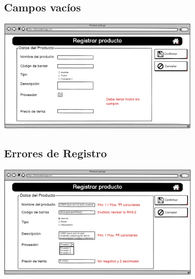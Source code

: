 \begin{flushleft}
	\subsection{Campos vacíos} \label{Campos vacíos}
	\begin{center}
		\includegraphics[width=10cm]{pantallas/images/29camposvacios.PNG}\\	
		 	
	\end{center}
	\subsection{Errores de Registro} \label{Errores de Registro}
	\begin{center}
		\includegraphics[width=10cm]{pantallas/images/30errores.PNG}\\	
		 	
	\end{center}

\end{flushleft}
